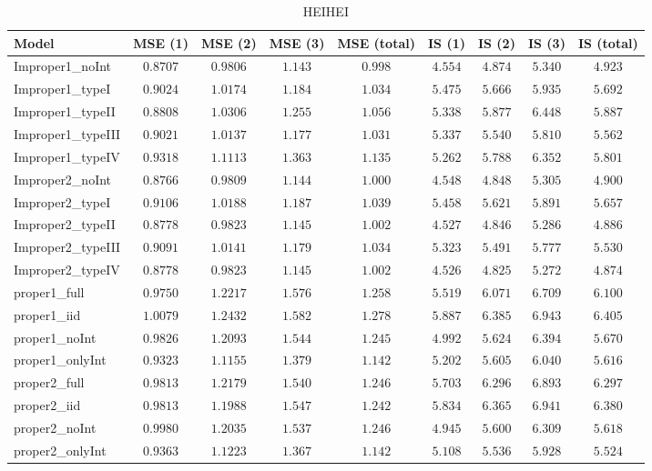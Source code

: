 \begin{table}

\caption{\label{tab:model-choice-sc7}HEIHEI}
\centering
\begin{tabular}{lcccccccc}
\hline
Model  & MSE (1) & MSE (2) & MSE (3) & MSE (total) & IS (1) & IS (2) & IS (3) & \multicolumn{1}{c}{IS (total)} \\ 
\hline
Improper1_noInt  & $0.8707$ & $0.9806$ & $1.143$ & $0.998$ & $4.554$ & $4.874$ & $5.340$ & $4.923$ \\
Improper1_typeI  & $0.9024$ & $1.0174$ & $1.184$ & $1.034$ & $5.475$ & $5.666$ & $5.935$ & $5.692$ \\
Improper1_typeII  & $0.8808$ & $1.0306$ & $1.255$ & $1.056$ & $5.338$ & $5.877$ & $6.448$ & $5.887$ \\
Improper1_typeIII  & $0.9021$ & $1.0137$ & $1.177$ & $1.031$ & $5.337$ & $5.540$ & $5.810$ & $5.562$ \\
Improper1_typeIV  & $0.9318$ & $1.1113$ & $1.363$ & $1.135$ & $5.262$ & $5.788$ & $6.352$ & $5.801$ \\
Improper2_noInt  & $0.8766$ & $0.9809$ & $1.144$ & $1.000$ & $4.548$ & $4.848$ & $5.305$ & $4.900$ \\
Improper2_typeI  & $0.9106$ & $1.0188$ & $1.187$ & $1.039$ & $5.458$ & $5.621$ & $5.891$ & $5.657$ \\
Improper2_typeII  & $0.8778$ & $0.9823$ & $1.145$ & $1.002$ & $4.527$ & $4.846$ & $5.286$ & $4.886$ \\
Improper2_typeIII  & $0.9091$ & $1.0141$ & $1.179$ & $1.034$ & $5.323$ & $5.491$ & $5.777$ & $5.530$ \\
Improper2_typeIV  & $0.8778$ & $0.9823$ & $1.145$ & $1.002$ & $4.526$ & $4.825$ & $5.272$ & $4.874$ \\
proper1_full  & $0.9750$ & $1.2217$ & $1.576$ & $1.258$ & $5.519$ & $6.071$ & $6.709$ & $6.100$ \\
proper1_iid  & $1.0079$ & $1.2432$ & $1.582$ & $1.278$ & $5.887$ & $6.385$ & $6.943$ & $6.405$ \\
proper1_noInt  & $0.9826$ & $1.2093$ & $1.544$ & $1.245$ & $4.992$ & $5.624$ & $6.394$ & $5.670$ \\
proper1_onlyInt  & $0.9323$ & $1.1155$ & $1.379$ & $1.142$ & $5.202$ & $5.605$ & $6.040$ & $5.616$ \\
proper2_full  & $0.9813$ & $1.2179$ & $1.540$ & $1.246$ & $5.703$ & $6.296$ & $6.893$ & $6.297$ \\
proper2_iid  & $0.9813$ & $1.1988$ & $1.547$ & $1.242$ & $5.834$ & $6.365$ & $6.941$ & $6.380$ \\
proper2_noInt  & $0.9980$ & $1.2035$ & $1.537$ & $1.246$ & $4.945$ & $5.600$ & $6.309$ & $5.618$ \\
proper2_onlyInt  & $0.9363$ & $1.1223$ & $1.367$ & $1.142$ & $5.108$ & $5.536$ & $5.928$ & $5.524$ \\
\hline 
\end{tabular}


\end{table}